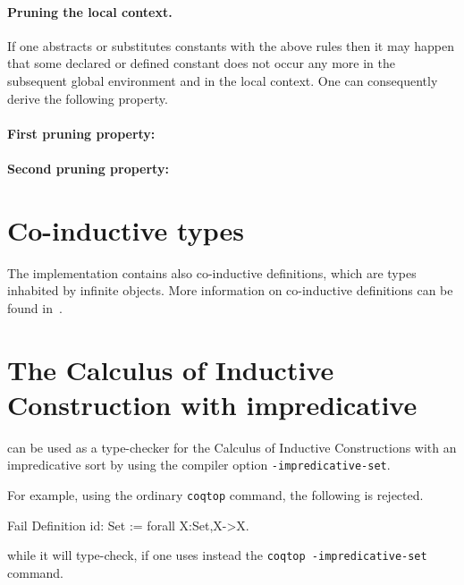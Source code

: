 
\paragraph{Pruning the local context.}
If one abstracts or substitutes constants with the above rules then it
may happen that some declared or defined constant does not occur any
more in the subsequent global environment and in the local context. One can
consequently derive the following property.

\paragraph{First pruning property:}
 
\paragraph{Second pruning property:}
 
\section{Co-inductive types}
The implementation contains also co-inductive definitions, which are
types inhabited by infinite objects. 
More information on co-inductive definitions can be found
in~\cite{Gimenez95b,Gim98,GimCas05}.

\section[The Calculus of Inductive Construction with
  impredicative \Set]{The Calculus of Inductive Construction with
  impredicative \Set\label{impredicativity}}

\Coq{} can be used as a type-checker for the
Calculus of Inductive Constructions with an impredicative sort \Set{}
by using the compiler option \texttt{-impredicative-set}.

For example, using the ordinary \texttt{coqtop} command, the following
is rejected.
\begin{coq_example}
Fail Definition id: Set := forall X:Set,X->X.
\end{coq_example}
while it will type-check, if one uses instead the \texttt{coqtop
  -impredicative-set} command.

